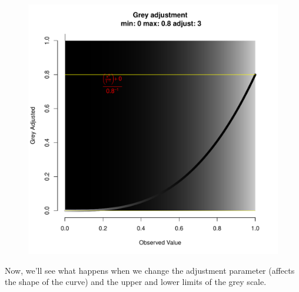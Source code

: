 \documentclass[letterpaper]{article}\usepackage[]{graphicx}\usepackage[]{color}
\newenvironment{knitrout}{}{} %
\begin{document}
\begin{figure}[h!]
\begin{minipage}[b]{0.45\linewidth}
\begin{knitrout}
{\centering \includegraphics[width=\linewidth]{figure/greywidth_inverse} 

}



\end{knitrout}

\end{minipage}
\end{figure}

Now, we'll see what happens when we change the adjustment parameter (affects the shape of the curve) and the upper and lower limits of the grey scale.
\end{document}
